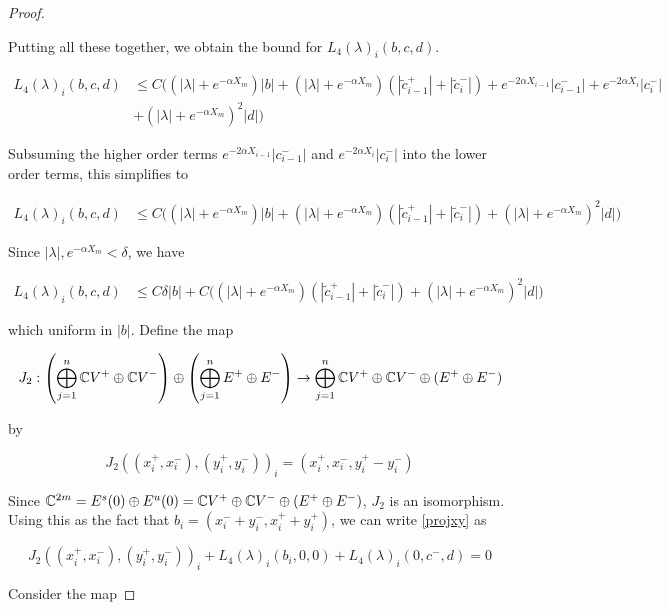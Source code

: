 \documentclass[thesis.tex]{subfiles}
\begin{document}
\begin{lemma}
\begin{proof}
\begin{enumerate}
\end{enumerate}

Putting all these together, we obtain the bound for $L_4(\lambda)_i(b, c, d)$.

\begin{align*}
L_4(\lambda)_i(b, c, d) &\leq 
C\Big( (|\lambda| + e^{-\alpha X_m})|b| 
+ (|\lambda| + e^{-\alpha X_m})(|\tilde{c}_{i-1}^+| + |\tilde{c}_i^-|) + e^{-2\alpha X_{i-1}} |c_{i-1}^-| + e^{-2\alpha X_i} |c_i^-| \\
&+ (|\lambda| + e^{-\alpha X_m})^2 |d| \Big) 
\end{align*}

Subsuming the higher order terms $e^{-2\alpha X_{i-1}} |c_{i-1}^-|$ and $e^{-2\alpha X_i} |c_i^-|$ into the lower order terms, this simplifies to

\begin{align*}
L_4(\lambda)_i(b, c, d) &\leq 
C\Big( (|\lambda| + e^{-\alpha X_m})|b|  
+ (|\lambda| + e^{-\alpha X_m})(|\tilde{c}_{i-1}^+| + |\tilde{c}_i^-|) + (|\lambda| + e^{-\alpha X_m})^2 |d|  \Big) 
\end{align*}

Since $|\lambda|, e^{-\alpha X_m} < \delta$, we have

\begin{align*}
L_4(\lambda)_i(b, c, d) &\leq C \delta |b| 
+ C \Big( (|\lambda| + e^{-\alpha X_m})(|\tilde{c}_{i-1}^+| + |\tilde{c}_i^-|)+ (|\lambda| + e^{-\alpha X_m})^2 |d| \Big) 
\end{align*}

which uniform in $|b|$. Define the map

\[
J_2: \left( \bigoplus_{j=1}^n {\mathbb C} V^+ \oplus {\mathbb C} V^- \right) \oplus
\left( \bigoplus_{j=1}^n E^+ \oplus E^- \right) 
\rightarrow \bigoplus_{j=1}^n {\mathbb C} V^+ \oplus {\mathbb C} V^- \oplus (E^+ \oplus E^-)
\]

by 

\[
J_2( (x_i^+, x_i^-),(y_i^+, y_i^-))_i = ( x_i^+, x_i^-, y_i^+ - y_i^- )
\]

Since ${\mathbb C}^{2m} = E^s(0) \oplus E^u(0) = {\mathbb C} V^+ \oplus {\mathbb C} V^- \oplus (E^+ \oplus E^-)$, $J_2$ is an isomorphism. Using this as the fact that $b_i = (x_i^- + y_i^-, x_i^+ + y_i^+)$, we can write \eqref{projxy} as

\begin{equation}\label{projxy2}
J_2( (x_i^+, x_i^-),(y_i^+, y_i^-))_i 
+ L_4(\lambda)_i(b_i, 0, 0) + L_4(\lambda)_i(0, c^-, d) = 0
\end{equation}

Consider the map


\end{proof}
\end{lemma}
\end{document}
